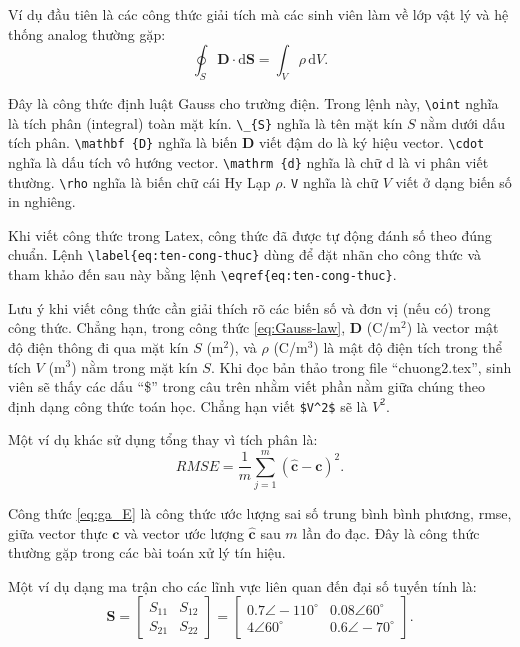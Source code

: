 	Ví dụ đầu tiên là các công thức giải tích mà các sinh viên làm về lớp vật lý và hệ thống analog thường gặp:
	\begin{equation}
		\oint _ {S}
		\mathbf {D} \cdot \mathrm {d} \mathbf {S} ={\int _{V}\rho \,\mathrm {d} V}.
		\label{eq:Gauss-law}
	\end{equation}	
	
	Đây là công thức định luật Gauss cho trường điện. 
	Trong lệnh này, \verb|\oint| nghĩa là tích phân (integral) toàn mặt kín.
	\verb|\_{S}| nghĩa là tên mặt kín $S$ nằm dưới dấu tích phân.
	\verb|\mathbf {D}| nghĩa là biến $\mathbf {D}$ viết đậm do là ký hiệu vector.
	\verb|\cdot| nghĩa là dấu tích vô hướng vector.
	\verb|\mathrm {d}| nghĩa là chữ d là vi phân viết thường.
	\verb|\rho| nghĩa là biến chữ cái Hy Lạp $\rho$.
	\verb|V| nghĩa là chữ $V$ viết ở dạng biến số in nghiêng.
	
	Khi viết công thức trong Latex, công thức đã được tự động đánh số theo đúng chuẩn.
	Lệnh \verb|\label{eq:ten-cong-thuc}| dùng để đặt nhãn cho công thức và tham khảo đến sau này bằng lệnh \verb|\eqref{eq:ten-cong-thuc}|.
	
	Lưu ý khi viết công thức cần giải thích rõ các biến số và đơn vị (nếu có) trong công thức.
	Chẳng hạn, trong công thức \eqref{eq:Gauss-law}, $\mathbf {D}$ (C/m$^2$) là vector mật độ điện thông đi qua mặt kín $S$ (m$^2$), và $\rho$ (C/m$^3$) là mật độ điện tích trong thể tích $V$ (m$^3$) nằm trong mặt kín $S$. 
	Khi đọc bản thảo trong file ``chuong2.tex'', sinh viên sẽ thấy các dấu ``\$'' trong câu trên nhằm viết phần nằm giữa chúng theo định dạng công thức toán học.
	Chẳng hạn viết \verb|$V^2$| sẽ là $V^2$.			
	
	Một ví dụ khác sử dụng tổng thay vì tích phân là:
	\begin{equation}
		RMSE=\frac{1}{m} \sum_{j=1}^{m} \mathbf{\left(\hat{c}-c\right)}^2. 
		\label{eq:ga_E}
	\end{equation}

	Công thức \eqref{eq:ga_E} là công thức ước lượng sai số trung bình bình phương, \ac{rmse}, giữa vector thực $\mathbf{c}$ và vector ước lượng $\mathbf{\hat{c}}$ sau $m$ lần đo đạc. 
	Đây là công thức thường gặp trong các bài toán xử lý tín hiệu.
	
	Một ví dụ dạng ma trận cho các lĩnh vực liên quan đến đại số tuyến tính là:
	\begin{equation}
		\mathbf{S} = 
			\begin{bmatrix}
				S_{11} & S_{12}\\
				S_{21} & S_{22}
				\end{bmatrix}
				=
				\begin{bmatrix}
				0.7 \angle -110^{\circ} & 0.08 \angle 60^{\circ}\\
				4 \angle 60^{\circ} & 0.6 \angle -70^{\circ}
			\end{bmatrix}.
		\label{eq:S-matrix}
	\end{equation}
	

